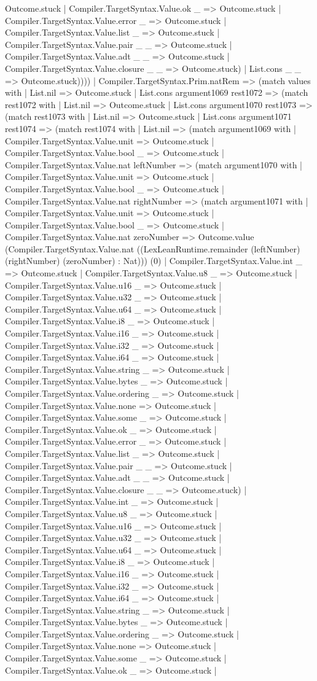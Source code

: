 \documentclass[11pt]{article}
\begin{document}
Outcome.stuck | Compiler.TargetSyntax.Value.ok \_ => Outcome.stuck | Compiler.TargetSyntax.Value.error \_ => Outcome.stuck | Compiler.TargetSyntax.Value.list \_ => Outcome.stuck | Compiler.TargetSyntax.Value.pair \_ \_ => Outcome.stuck | Compiler.TargetSyntax.Value.adt \_ \_ => Outcome.stuck | Compiler.TargetSyntax.Value.closure \_ \_ => Outcome.stuck) | List.cons \_ \_ => Outcome.stuck)))) | Compiler.TargetSyntax.Prim.natRem => (match values with | List.nil => Outcome.stuck | List.cons argument1069 rest1072 => (match rest1072 with | List.nil => Outcome.stuck | List.cons argument1070 rest1073 => (match rest1073 with | List.nil => Outcome.stuck | List.cons argument1071 rest1074 => (match rest1074 with | List.nil => (match argument1069 with | Compiler.TargetSyntax.Value.unit => Outcome.stuck | Compiler.TargetSyntax.Value.bool \_ => Outcome.stuck | Compiler.TargetSyntax.Value.nat leftNumber => (match argument1070 with | Compiler.TargetSyntax.Value.unit => Outcome.stuck | Compiler.TargetSyntax.Value.bool \_ => Outcome.stuck | Compiler.TargetSyntax.Value.nat rightNumber => (match argument1071 with | Compiler.TargetSyntax.Value.unit => Outcome.stuck | Compiler.TargetSyntax.Value.bool \_ => Outcome.stuck | Compiler.TargetSyntax.Value.nat zeroNumber => Outcome.value (Compiler.TargetSyntax.Value.nat ((LexLeanRuntime.remainder (leftNumber) (rightNumber) (zeroNumber) : Nat))) (0) | Compiler.TargetSyntax.Value.int \_ => Outcome.stuck | Compiler.TargetSyntax.Value.u8 \_ => Outcome.stuck | Compiler.TargetSyntax.Value.u16 \_ => Outcome.stuck | Compiler.TargetSyntax.Value.u32 \_ => Outcome.stuck | Compiler.TargetSyntax.Value.u64 \_ => Outcome.stuck | Compiler.TargetSyntax.Value.i8 \_ => Outcome.stuck | Compiler.TargetSyntax.Value.i16 \_ => Outcome.stuck | Compiler.TargetSyntax.Value.i32 \_ => Outcome.stuck | Compiler.TargetSyntax.Value.i64 \_ => Outcome.stuck | Compiler.TargetSyntax.Value.string \_ => Outcome.stuck | Compiler.TargetSyntax.Value.bytes \_ => Outcome.stuck | Compiler.TargetSyntax.Value.ordering \_ => Outcome.stuck | Compiler.TargetSyntax.Value.none => Outcome.stuck | Compiler.TargetSyntax.Value.some \_ => Outcome.stuck | Compiler.TargetSyntax.Value.ok \_ => Outcome.stuck | Compiler.TargetSyntax.Value.error \_ => Outcome.stuck | Compiler.TargetSyntax.Value.list \_ => Outcome.stuck | Compiler.TargetSyntax.Value.pair \_ \_ => Outcome.stuck | Compiler.TargetSyntax.Value.adt \_ \_ => Outcome.stuck | Compiler.TargetSyntax.Value.closure \_ \_ => Outcome.stuck) | Compiler.TargetSyntax.Value.int \_ => Outcome.stuck | Compiler.TargetSyntax.Value.u8 \_ => Outcome.stuck | Compiler.TargetSyntax.Value.u16 \_ => Outcome.stuck | Compiler.TargetSyntax.Value.u32 \_ => Outcome.stuck | Compiler.TargetSyntax.Value.u64 \_ => Outcome.stuck | Compiler.TargetSyntax.Value.i8 \_ => Outcome.stuck | Compiler.TargetSyntax.Value.i16 \_ => Outcome.stuck | Compiler.TargetSyntax.Value.i32 \_ => Outcome.stuck | Compiler.TargetSyntax.Value.i64 \_ => Outcome.stuck | Compiler.TargetSyntax.Value.string \_ => Outcome.stuck | Compiler.TargetSyntax.Value.bytes \_ => Outcome.stuck | Compiler.TargetSyntax.Value.ordering \_ => Outcome.stuck | Compiler.TargetSyntax.Value.none => Outcome.stuck | Compiler.TargetSyntax.Value.some \_ => Outcome.stuck | Compiler.TargetSyntax.Value.ok \_ => Outcome.stuck | 
\end{document}
